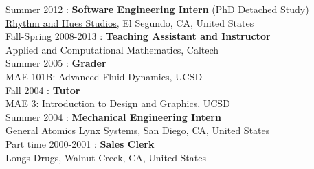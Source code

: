 
\noindent Summer 2012 : \textbf{Software Engineering Intern} (PhD Detached Study)\\
\href{http://www.rhythm.com}{Rhythm and Hues Studios},
El Segundo, CA, United States \\


\noindent Fall-Spring 2008-2013 : \textbf{Teaching Assistant and Instructor}\\
Applied and Computational Mathematics, Caltech\\


\noindent Summer 2005 : \textbf{Grader}\\
 MAE 101B: Advanced Fluid Dynamics, UCSD\\

\noindent Fall 2004 : \textbf{Tutor}\\
 MAE 3: Introduction to Design and Graphics, UCSD\\

\noindent Summer 2004 : \textbf{Mechanical Engineering Intern}\\
General Atomics Lynx Systems, San Diego, CA, United States\\


\noindent Part time 2000-2001 : \textbf{Sales Clerk}\\
Longs Drugs, Walnut Creek, CA, United States\\

\thispagestyle{lastpagestyle}




